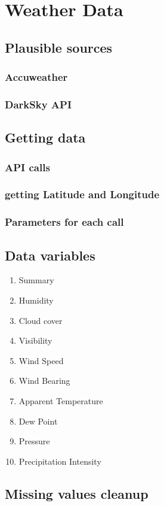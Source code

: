 \chapter{Weather Data}
\section{Plausible sources}
\subsection{Accuweather}
\subsection{DarkSky API}

\section{Getting data}
\subsection{API calls}
\subsection{getting Latitude and Longitude}
\subsection{Parameters for each call}

\section{Data variables}
\begin{enumerate}
    \item Summary
    \item Humidity
    \item Cloud cover
    \item Visibility
    \item Wind Speed
    \item Wind Bearing
    \item Apparent Temperature
    \item Dew Point
    \item Pressure
    \item Precipitation Intensity
\end{enumerate}

\section{Missing values cleanup}

